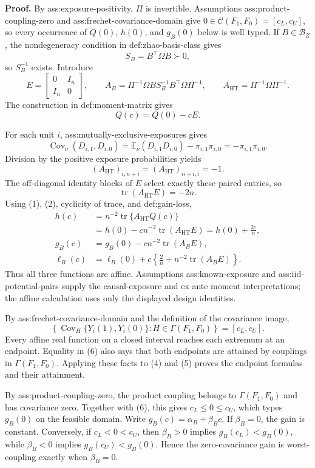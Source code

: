 \textbf{Proof.}
By ass:exposure-positivity, \(\Pi\) is invertible. Assumptions ass:product-coupling-zero and ass:frechet-covariance-domain give \(0\in\mathcal C(F_1,F_0)=[c_L,c_U]\), so every occurrence of \(Q(0)\), \(h(0)\), and \(g_B(0)\) below is well typed. If \(B\in\mathcal B_Z\), the nondegeneracy condition in def:zhao-basis-class gives
\[
S_B=B^{\top}\Omega B\succ0,
\]
so \(S_B^{-1}\) exists. Introduce
\[
E=\begin{bmatrix}0&I_n\\ I_n&0\end{bmatrix},\qquad
A_B=\Pi^{-1}\Omega B S_B^{-1}B^{\top}\Omega\Pi^{-1},\qquad
A_{\mathrm{HT}}=\Pi^{-1}\Omega\Pi^{-1}.
\]
The construction in def:moment-matrix gives
\[
Q(c)=Q(0)-cE. \tag{1}
\]

For each unit \(i\), ass:mutually-exclusive-exposures gives
\[
\operatorname{Cov}_{\nu}(D_{i,1},D_{i,0})
=\mathbb E_{\nu}(D_{i,1}D_{i,0})-\pi_{i,1}\pi_{i,0}
=-\pi_{i,1}\pi_{i,0}.
\]
Division by the positive exposure probabilities yields
\[
(A_{\mathrm{HT}})_{i,n+i}=(A_{\mathrm{HT}})_{n+i,i}=-1.
\]
The off-diagonal identity blocks of \(E\) select exactly these paired entries, so
\[
\operatorname{tr}(A_{\mathrm{HT}}E)=-2n. \tag{2}
\]
Using (1), (2), cyclicity of trace, and def:gain-loss,
\[
\begin{aligned}
h(c)
&=n^{-2}\operatorname{tr}\{A_{\mathrm{HT}}Q(c)\}\\
&=h(0)-c n^{-2}\operatorname{tr}(A_{\mathrm{HT}}E)
=h(0)+\frac{2c}{n}, \tag{3}\\
g_B(c)
&=g_B(0)-c n^{-2}\operatorname{tr}(A_BE), \tag{4}\\
\ell_B(c)
&=\ell_B(0)+c\left\{\frac2n+n^{-2}\operatorname{tr}(A_BE)\right\}. \tag{5}
\end{aligned}
\]
Thus all three functions are affine. Assumptions ass:known-exposure and ass:iid-potential-pairs supply the causal-exposure and ex ante moment interpretations; the affine calculation uses only the displayed design identities.

By ass:frechet-covariance-domain and the definition of the covariance image,
\[
\left\{\operatorname{Cov}_H\{Y_i(1),Y_i(0)\}:H\in\Gamma(F_1,F_0)\right\}
=[c_L,c_U]. \tag{6}
\]
Every affine real function on a closed interval reaches each extremum at an endpoint. Equality in (6) also says that both endpoints are attained by couplings in \(\Gamma(F_1,F_0)\). Applying these facts to (4) and (5) proves the endpoint formulas and their attainment.

By ass:product-coupling-zero, the product coupling belongs to \(\Gamma(F_1,F_0)\) and has covariance zero. Together with (6), this gives \(c_L\le0\le c_U\), which types \(g_B(0)\) on the feasible domain. Write \(g_B(c)=\alpha_B+\beta_Bc\). If \(\beta_B=0\), the gain is constant. Conversely, if \(c_L<0<c_U\), then \(\beta_B>0\) implies \(g_B(c_L)<g_B(0)\), while \(\beta_B<0\) implies \(g_B(c_U)<g_B(0)\). Hence the zero-covariance gain is worst-coupling exactly when \(\beta_B=0\).

